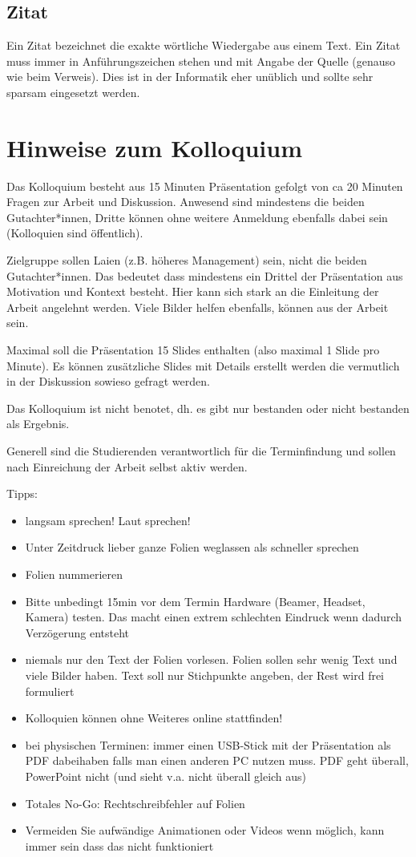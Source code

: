 \documentclass[12pt,oneside]{article}
\begin{document}
\subsection{Zitat}
Ein Zitat bezeichnet die exakte wörtliche Wiedergabe aus einem Text. Ein Zitat muss immer in
Anführungszeichen stehen und mit Angabe der Quelle (genauso wie beim Verweis). Dies ist in der Informatik eher unüblich und sollte sehr sparsam eingesetzt werden.

\section{Hinweise zum Kolloquium}
Das Kolloquium besteht aus 15 Minuten Präsentation gefolgt von ca 20 Minuten Fragen zur Arbeit und Diskussion. Anwesend sind mindestens die beiden Gutachter*innen, Dritte können ohne weitere Anmeldung ebenfalls dabei sein (Kolloquien sind öffentlich). 

Zielgruppe sollen Laien (z.B. höheres Management) sein, nicht die beiden Gutachter*innen. Das bedeutet dass mindestens ein Drittel der Präsentation aus Motivation und Kontext besteht. Hier kann sich stark an die Einleitung der Arbeit angelehnt werden. Viele Bilder helfen ebenfalls, können aus der Arbeit sein.

Maximal soll die Präsentation 15 Slides enthalten (also maximal 1 Slide pro Minute). Es können zusätzliche Slides mit Details erstellt werden die vermutlich in der Diskussion sowieso gefragt werden.

Das Kolloquium ist nicht benotet, dh. es gibt nur bestanden oder nicht bestanden als Ergebnis. 

Generell sind die Studierenden verantwortlich für die Terminfindung und sollen nach Einreichung der Arbeit selbst aktiv werden. 

Tipps:
\begin{itemize}
    \item langsam sprechen! Laut sprechen!
    \item Unter Zeitdruck lieber ganze Folien weglassen als schneller sprechen
    \item Folien nummerieren
    \item Bitte unbedingt 15min vor dem Termin Hardware (Beamer, Headset, Kamera) testen. Das macht einen extrem schlechten Eindruck wenn dadurch Verzögerung entsteht
    \item niemals nur den Text der Folien vorlesen. Folien sollen sehr wenig Text und viele Bilder haben. Text soll nur Stichpunkte angeben, der Rest wird frei formuliert
    \item Kolloquien können ohne Weiteres online stattfinden!
    \item bei physischen Terminen: immer einen USB-Stick mit der Präsentation als PDF dabeihaben falls man einen anderen PC nutzen muss. PDF geht überall, PowerPoint nicht (und sieht v.a. nicht überall gleich aus)
    \item Totales No-Go: Rechtschreibfehler auf Folien
    \item Vermeiden Sie aufwändige Animationen oder Videos wenn möglich, kann immer sein dass das nicht funktioniert
\end{itemize}


\end{document}
